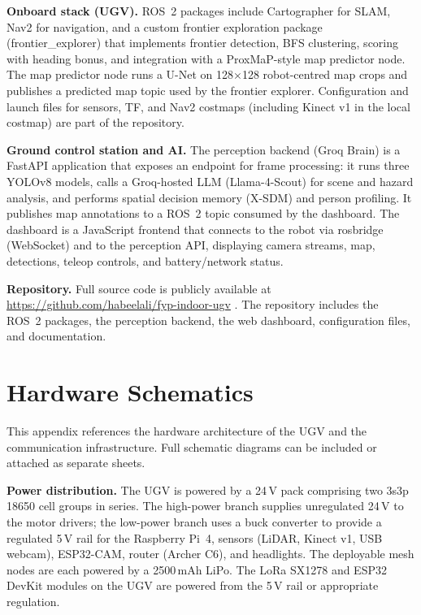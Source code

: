 \textbf{Onboard stack (UGV).} ROS~2 packages include Cartographer for SLAM, Nav2 for navigation, and a custom frontier exploration package (frontier\_explorer) that implements frontier detection, BFS clustering, scoring with heading bonus, and integration with a ProxMaP-style map predictor node. The map predictor node runs a U-Net on 128$\times$128 robot-centred map crops and publishes a predicted map topic used by the frontier explorer. Configuration and launch files for sensors, TF, and Nav2 costmaps (including Kinect v1 in the local costmap) are part of the repository.

\textbf{Ground control station and AI.} The perception backend (Groq Brain) is a FastAPI application that exposes an endpoint for frame processing: it runs three YOLOv8 models, calls a Groq-hosted LLM (Llama-4-Scout) for scene and hazard analysis, and performs spatial decision memory (X-SDM) and person profiling. It publishes map annotations to a ROS~2 topic consumed by the dashboard. The dashboard is a JavaScript frontend that connects to the robot via rosbridge (WebSocket) and to the perception API, displaying camera streams, map, detections, teleop controls, and battery/network status.

\textbf{Repository.} Full source code is publicly available at \url{https://github.com/habeelali/fyp-indoor-ugv} \cite{fyprepo}. The repository includes the ROS~2 packages, the perception backend, the web dashboard, configuration files, and documentation.

\chapter{Hardware Schematics}
\label{app:schematics}

This appendix references the hardware architecture of the UGV and the communication infrastructure. Full schematic diagrams can be included or attached as separate sheets.

\textbf{Power distribution.} The UGV is powered by a 24\,V pack comprising two 3s3p 18650 cell groups in series. The high-power branch supplies unregulated 24\,V to the motor drivers; the low-power branch uses a buck converter to provide a regulated 5\,V rail for the Raspberry Pi~4, sensors (LiDAR, Kinect v1, USB webcam), ESP32-CAM, router (Archer C6), and headlights. The deployable mesh nodes are each powered by a 2500\,mAh LiPo. The LoRa SX1278 and ESP32 DevKit modules on the UGV are powered from the 5\,V rail or appropriate regulation.

